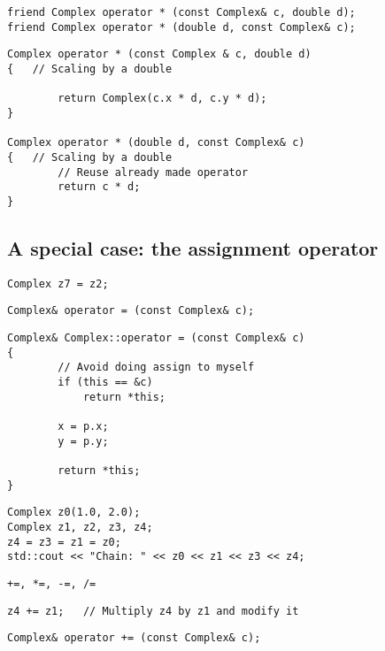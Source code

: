 \begin{lstlisting}
friend Complex operator * (const Complex& c, double d);
friend Complex operator * (double d, const Complex& c);
\end{lstlisting}


\begin{lstlisting}
Complex operator * (const Complex & c, double d)
{	// Scaling by a double

		return Complex(c.x * d, c.y * d);
}

Complex operator * (double d, const Complex& c)
{	// Scaling by a double
		// Reuse already made operator
		return c * d;
}
\end{lstlisting}

\subsection{A special case: the assignment operator}

\begin{lstlisting}
Complex z7 = z2;
\end{lstlisting}

\begin{lstlisting}
Complex& operator = (const Complex& c);
\end{lstlisting}

\begin{lstlisting}
Complex& Complex::operator = (const Complex& c)
{
		// Avoid doing assign to myself
		if (this == &c)
			return *this;
			
		x = p.x;
		y = p.y;

		return *this;
}
\end{lstlisting}

\begin{lstlisting}
Complex z0(1.0, 2.0);
Complex z1, z2, z3, z4;
z4 = z3 = z1 = z0;
std::cout << "Chain: " << z0 << z1 << z3 << z4;
\end{lstlisting}

\begin{lstlisting}
+=, *=, -=, /=
\end{lstlisting}

\begin{lstlisting}
z4 += z1;	// Multiply z4 by z1 and modify it
\end{lstlisting}

\begin{lstlisting}
Complex& operator += (const Complex& c);
\end{lstlisting}

